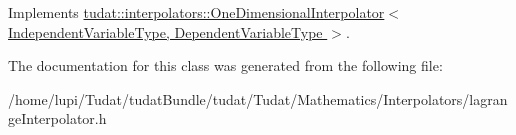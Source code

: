 Implements \hyperlink{classtudat_1_1interpolators_1_1OneDimensionalInterpolator_a1756cce160465357493e18221aa49dee}{tudat\+::interpolators\+::\+One\+Dimensional\+Interpolator$<$ Independent\+Variable\+Type, Dependent\+Variable\+Type $>$}.



The documentation for this class was generated from the following file\+:\begin{DoxyCompactItemize}
\item 
/home/lupi/\+Tudat/tudat\+Bundle/tudat/\+Tudat/\+Mathematics/\+Interpolators/lagrange\+Interpolator.\+h\end{DoxyCompactItemize}
